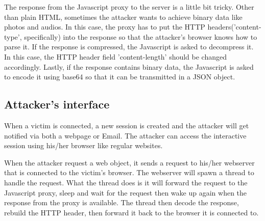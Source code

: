 The response from the Javascript proxy to the server is a little bit tricky. Other than plain HTML, sometimes the attacker wants to achieve binary data like photos and audios. In this case, the proxy has to put the HTTP headers('content-type', specifically) into the response so that the attacker's browser knows how to parse it. If the response is compressed, the Javascript is asked to decompress it. In this case, the HTTP header field 'content-length' should be changed accordingly. Lastly, if the response contains binary data, the Javascript is asked to encode it using base64 so that it can be transmitted in a JSON object. 

\subsection{Attacker's interface}
When a victim is connected, a new session is created and the attacker will get notified via both a webpage or Email. The attacker can access the interactive session using his/her browser like regular websites. 

When the attacker request a web object, it sends a request to his/her webserver that is connected to the victim's browser. The webserver will spawn a thread to handle the request. What the thread does is it will forward the request to the Javascript proxy, sleep and wait for the request then wake up again when the response from the proxy is available. The thread then decode the response, rebuild the HTTP header, then forward it back to the browser it is connected to.
